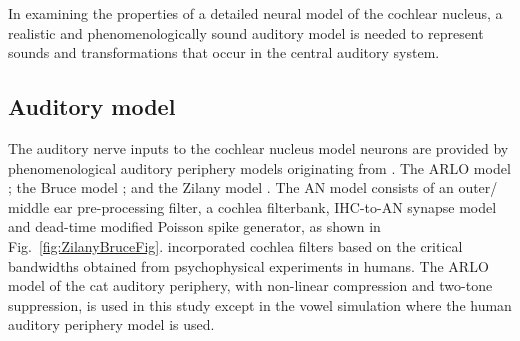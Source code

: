 



% 

In examining the properties of a detailed neural model of the cochlear nucleus,
a realistic and phenomenologically sound auditory model is needed to represent
sounds and transformations that occur in the central auditory system.

% 
\subsection{Auditory model    \label{sec:CN:resp-audit-models}}

The auditory nerve inputs to the cochlear nucleus model neurons are provided by
phenomenological auditory periphery models originating from
\citet{Carney:1993}. The ARLO model \citep{HeinzZhangEtAl:2001}; the Bruce model
\citep{BruceSachsEtAl:2003, ZilanyBruce:2006, ZilanyBruce:2007}; and the Zilany
model \citep{ZilanyBruceEtAl:2009}. The AN model consists of an outer\slash
middle ear pre-processing filter, a cochlea filterbank, IHC-to-AN synapse model
and dead-time modified Poisson spike generator, as shown in
Fig.~\ref{fig:ZilanyBruceFig}. \citep{HeinzZhangEtAl:2001} incorporated cochlea
filters based on the critical bandwidths obtained from psychophysical
experiments in humans. The ARLO model of the cat auditory periphery, with
non-linear compression and two-tone suppression, is used in this study except in
the vowel simulation where the human auditory periphery model is used.



